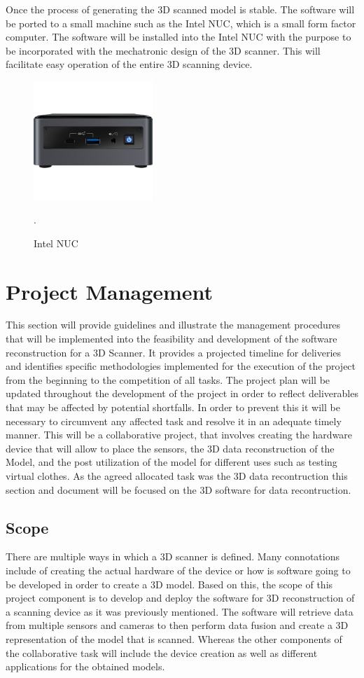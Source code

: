 \documentclass[12pt]{report}
\begin{document}
Once the process of generating the 3D scanned model is stable. The software will be ported to a small machine such as the Intel NUC, which is a small form factor computer. 
The software will be installed into the Intel NUC with the purpose to be incorporated with the mechatronic design of the 3D scanner. This will facilitate easy operation of the entire 3D scanning device.
\begin{figure}[h]
  \centering
  \includegraphics[width=0.4\textwidth]{Nuc.png}
  \caption{Intel NUC}\citep*{IntelNuc}.
  \label{fig:NUC}
\end{figure}


\chapter{Project Management}
This section will provide  guidelines and illustrate the management procedures that will be implemented into the feasibility and development of the software reconstruction for a 3D Scanner. 
It provides a projected timeline for deliveries and identifies  specific methodologies implemented for the execution of the project from the beginning to the competition of all tasks.
The project plan will be updated throughout the  development of the project in order to reflect deliverables that may be affected by potential shortfalls.
In order to prevent this it will be necessary to circumvent any affected task and resolve it in an adequate timely manner. 
This will be a collaborative project, that involves creating the hardware device that will allow to place the sensors, the 3D data reconstruction of the Model, and the post utilization of the model for different uses such as testing virtual clothes. 
As the agreed allocated task was the 3D data recontruction this section and document will be focused on the 3D software for data recontruction.

\section{Scope}
There are multiple ways in which a 3D scanner is defined. Many connotations include of creating the actual hardware of the device or how is software going to be developed in order to create a 3D model. 
Based on this, the scope of this project component is to develop and deploy the software for 3D reconstruction of a scanning device as it was previously mentioned. 
The software will retrieve data from multiple sensors and cameras to then perform data fusion and create a 3D representation of the model that is scanned. Whereas the other components of the collaborative task will include the device creation as well as different applications for the obtained models. 
\end{document}
